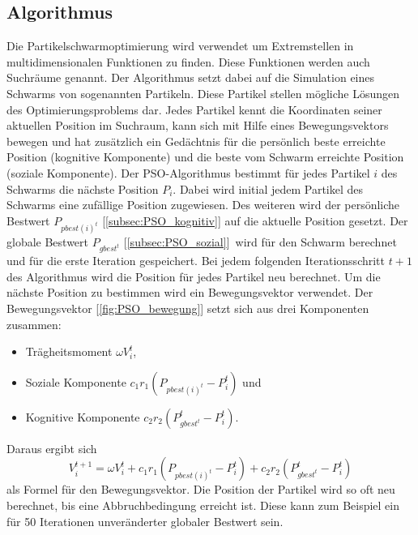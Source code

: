 \documentclass[pdftex,
               12pt,
               DIV=12,
               a4paper,
               twoside,
               parskip=half,
               abstract=true,
               dvipsnames]{scrartcl}
\begin{document}
\subsection{Algorithmus}
Die Partikelschwarmoptimierung wird verwendet um Extremstellen in multidimensionalen Funktionen zu finden. Diese Funktionen werden auch Suchr\"aume genannt. Der Algorithmus setzt dabei auf die Simulation eines Schwarms von sogenannten Partikeln. Diese Partikel stellen m\"ogliche L\"osungen des Optimierungsproblems dar. Jedes Partikel kennt die Koordinaten seiner aktuellen Position im Suchraum, kann sich mit Hilfe eines Bewegungsvektors bewegen und hat zus\"atzlich ein Ged\"achtnis f\"ur die pers\"onlich beste erreichte Position (kognitive Komponente) und die beste vom Schwarm erreichte Position (soziale Komponente). Der PSO-Algorithmus bestimmt f\"ur  jedes Partikel $i$ des Schwarms die n\"achste Position $P_i$. Dabei wird initial jedem Partikel des Schwarms eine zuf\"allige Position zugewiesen. Des weiteren wird der pers\"onliche Bestwert $P_{pbest(i)^t}$ [\cref{subsec:PSO_kognitiv}] auf die aktuelle Position gesetzt. Der globale Bestwert $P_{gbest^t}$ [\cref{subsec:PSO_sozial}] wird f\"ur den Schwarm berechnet und f\"ur die erste Iteration gespeichert. Bei jedem folgenden Iterationsschritt $t+1$ des Algorithmus wird die Position f\"ur jedes Partikel neu berechnet. Um die n\"achste Position zu bestimmen wird ein Bewegungsvektor verwendet. Der Bewegungsvektor [\cref{fig:PSO_bewegung}] setzt sich aus drei Komponenten zusammen:
\begin{itemize}
	\item Tr\"agheitsmoment $\omega V_i^t$,
	\item Soziale Komponente $c_1r_1\left(P_{pbest(i)^t}-P_i^t\right)$ und
	\item Kognitive Komponente $c_2r_2\left(P_{gbest^t}^t-P_i^t\right)$.
\end{itemize}
Daraus ergibt sich \[V_i^{t+1} = \omega V_i^t + c_1r_1\left(P_{pbest(i)^t}-P_i^t\right) + c_2r_2\left(P_{gbest^t}^t-P_i^t\right)\] als Formel f\"ur den Bewegungsvektor. Die Position der Partikel wird so oft neu berechnet, bis eine Abbruchbedingung erreicht ist. Diese kann zum Beispiel ein f\"ur 50 Iterationen unver\"anderter globaler Bestwert sein. \cite[vgl.][]{KennedyEberhart95, ZhangWangJi15}
\end{document}
